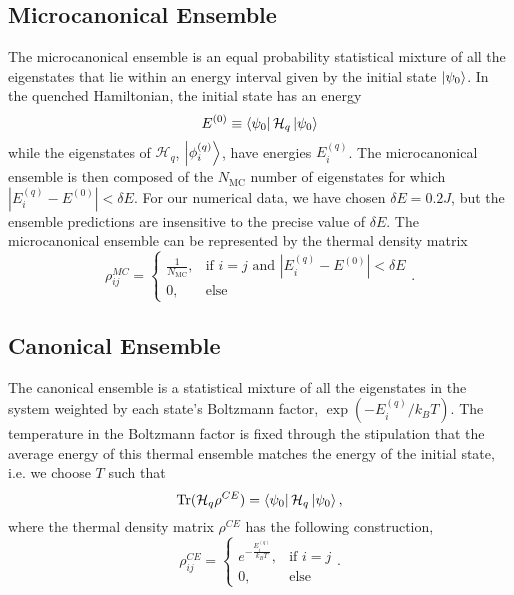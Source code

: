 \subsection{Microcanonical Ensemble}
The microcanonical ensemble is an equal probability statistical mixture of all
the eigenstates that lie within an energy interval given by the initial state
$\left|\psi_0\right\rangle$.
In the quenched Hamiltonian, the initial state has an energy
\[E^{(0)} \equiv \left\langle \psi_0\right| \mathcal H_q \left|\psi_0\right\rangle\]
while the eigenstates of $\mathcal H_q$, $\left|\phi^{(q)}_i\right\rangle$, have energies
$E_i^{(q)}$. The microcanonical ensemble is then composed of the $N_\text{MC}$
number of eigenstates for which ${|E_i^{(q)} - E^{(0)}| < \delta E}$. For our numerical
data, we have chosen $\delta E = 0.2 J$, but the ensemble predictions are insensitive to the precise value of $\delta E$. The microcanonical ensemble can be represented by the
thermal density matrix
\[\rho_{ij}^{MC} = 
    \begin{cases} 
        \frac1{N_\text{MC}}, & \text{if $i = j$ and $|E_i^{(q)} - E^{(0)}| < \delta E$} \\
        0, & \text{else}
    \end{cases}.\]

\subsection{Canonical Ensemble}
\label{sec:canonical}
The canonical ensemble is a statistical mixture of all the eigenstates in the
system weighted by each state's Boltzmann factor, $\exp(-E_i^{(q)}/k_BT)$. The
temperature in the Boltzmann factor is fixed through the stipulation that the
average energy of this thermal ensemble matches the energy of the initial state,
i.e. we choose $T$ such that
\[\mathrm{Tr}(\mathcal H_q \rho^{CE}) = \left\langle \psi_0\right| \mathcal H_q \left|\psi_0\right\rangle,\]
where the thermal density matrix $\rho^{CE}$ has the following construction,
\[\rho_{ij}^{CE} = 
    \begin{cases} 
        e^{-\frac{E_i^{(q)}}{k_B T}}, & \text{if $i = j$} \\
        0, & \text{else}
    \end{cases}.\]

